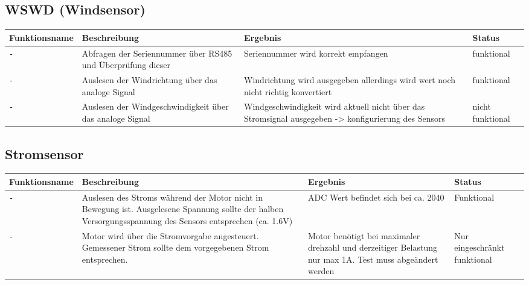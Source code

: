 \documentclass{article}
\begin{document}
	\subsection{WSWD (Windsensor)}
		\begin{tabular}{|p{3.2cm}|p{5.5cm}|p{4cm}| p{1.6cm} |}
			\hline
				\textbf{Funktionsname} & \textbf{Beschreibung} & \textbf{Ergebnis} & \textbf{Status} \\
			\hline
				\texttt{-} & Abfragen der Seriennummer über RS485 und Überprüfung dieser & Seriennummer wird korrekt empfangen & funktional \\
			\hline
			\texttt{-} & Auslesen der Windrichtung über das analoge Signal & Windrichtung wird ausgegeben allerdings wird wert noch nicht richtig konvertiert & funktional \\
			\hline
			\texttt{-} & Auslesen der Windgeschwindigkeit über das analoge Signal & Windgeschwindigkeit wird aktuell nicht über das Stromsignal ausgegeben -> konfigurierung des Sensors & nicht funktional \\
			\hline
		\end{tabular}
	\subsection{Stromsensor}
		\begin{tabular}{|p{3.2cm}|p{5.5cm}|p{4cm}| p{1.6cm} |}
			\hline
				\textbf{Funktionsname} & \textbf{Beschreibung} & \textbf{Ergebnis} & \textbf{Status} \\
			\hline
				\texttt{-} & Auslesen des Stroms während der Motor nicht in Bewegung ist. Ausgelesene Spannung sollte der halben Versorgungsspannung des Sensors entsprechen (ca. 1.6V) & ADC Wert befindet sich bei ca. 2040 & Funktional \\
			\hline
				\texttt{-} & Motor wird über die Stromvorgabe angesteuert. Gemessener Strom sollte dem vorgegebenen Strom entsprechen. & Motor benötigt bei maximaler drehzahl und derzeitiger Belastung nur max 1A. Test muss abgeändert werden & Nur eingeschränkt funktional \\
			\hline
		\end{tabular} 
\end{document}
